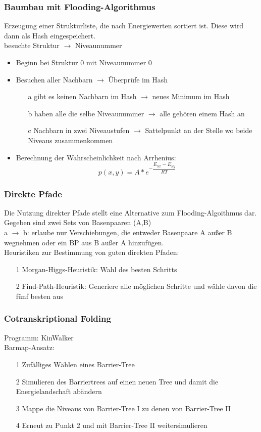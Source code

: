 \subsubsection{Baumbau mit Flooding-Algorithmus}
Erzeugung einer Strukturliste, die nach Energiewerten sortiert ist. Diese wird dann als Hash eingespeichert.\\
besuchte Struktur $\rightarrow$ Niveaunummer
\begin{itemize}
\item Beginn bei Struktur 0 mit Niveaunummer 0
\item Besuchen aller Nachbarn $\rightarrow$ Überprüfe im Hash
\begin{itemize}
\item[a] gibt es keinen Nachbarn im Hash $\rightarrow$ neues Minimum im Hash 
\item[b] haben alle die selbe Niveaunummer $\rightarrow$ alle gehören einem Hash an
\item[c] Nachbarn in zwei Niveaustufen $\rightarrow$ Sattelpunkt an der Stelle wo beide Niveaus zusammenkommen
\end{itemize}
\item Berechnung der Wahrscheinlichkeit nach Arrhenius:
\begin{equation}
p(x,y) = A*e^{-\dfrac{E_{Sx}-E_{Sy}}{RT}}
\end{equation}
\end{itemize}

\subsubsection{Direkte Pfade}
Die Nutzung direkter Pfade stellt eine Alternative zum Flooding-Algoithmus dar.\\
Gegeben sind zwei Sets von Basenpaaren (A,B)\\
a $\rightarrow$ b: erlaube nur Verschiebungen, die entweder Basenpaare A außer B wegnehmen oder ein BP aus B außer A hinzufügen. \\
Heuristiken zur Bestimmung von guten direkten Pfaden:
\begin{itemize}
\item[1] Morgan-Higgs-Heuristik: Wahl des besten Schritts
\item[2] Find-Path-Heuristik: Generiere alle möglichen Schritte und wähle davon die fünf besten aus
\end{itemize}

\subsubsection{Cotranskriptional Folding}
Programm: KinWalker \\

Barmap-Ansatz:
\begin{itemize}
\item[1] Zufälliges Wählen eines Barrier-Tree
\item[2] Simulieren des Barriertrees auf einen neuen Tree und damit die Energielandschaft abändern
\item[3] Mappe die Niveaus von Barrier-Tree I zu denen von Barrier-Tree II
\item[4] Erneut zu Punkt 2 und mit Barrier-Tree II weitersimulieren 
\end{itemize}
